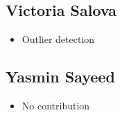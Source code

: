 \documentclass[letterpaper, 12 pt, conference]{ieeeconf}  %
\begin{document}
\subsection*{Victoria Salova}
        \begin{itemize}
                \item Outlier detection
        \end{itemize}

\subsection*{Yasmin Sayeed}
        \begin{itemize}
                \item No contribution
        \end{itemize}
\end{document}
